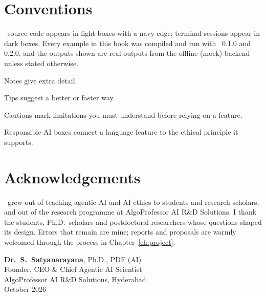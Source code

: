 \section*{Conventions}

\algolang\ source code appears in light boxes with a navy edge; terminal sessions appear in dark boxes. Every example in this book was compiled and run with \algolang~0.1.0 and 0.2.0, and the outputs shown are real outputs from the offline (mock) backend unless stated otherwise.

\begin{note}
Notes give extra detail.
\end{note}
\begin{tip}
Tips suggest a better or faster way.
\end{tip}
\begin{caution}
Cautions mark limitations you must understand before relying on a feature.
\end{caution}
\begin{ethics}
Responsible-AI boxes connect a language feature to the ethical principle it supports.
\end{ethics}

\section*{Acknowledgements}

\algolang\ grew out of teaching agentic AI and AI ethics to students and research scholars, and out of the research programme at AlgoProfessor AI R\&D Solutions. I thank the students, Ph.D.\ scholars and postdoctoral researchers whose questions shaped its design. Errors that remain are mine; reports and proposals are warmly welcomed through the process in Chapter~\ref{ch:project}.

\vspace{10pt}
\begin{flushright}
\sffamily
\textbf{Dr.\ S.\ Satyanarayana}, Ph.D., PDF (AI)\\
{\small Founder, CEO \& Chief Agentic AI Scientist}\\
{\small AlgoProfessor AI R\&D Solutions, Hyderabad}\\
{\small\color{muted} October 2026}
\end{flushright}
